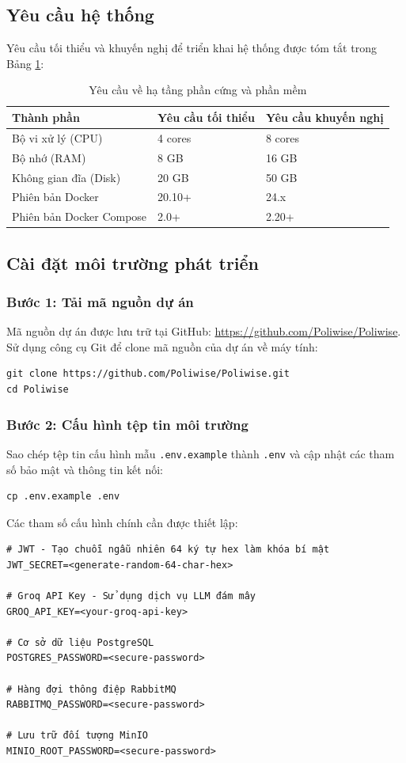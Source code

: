 \documentclass[12pt,a4paper]{report}
\begin{document}
\subsection{Yêu cầu hệ thống}
Yêu cầu tối thiểu và khuyến nghị để triển khai hệ thống được tóm tắt trong Bảng \ref{tab:req_specs}:
\begin{table}[H]
\centering
\caption{Yêu cầu về hạ tầng phần cứng và phần mềm}
\label{tab:req_specs}
\begin{tabularx}{\textwidth}{|l|X|X|}
\hline
\rowcolor{gray!10}
Thành phần & Yêu cầu tối thiểu & Yêu cầu khuyến nghị \\ \hline
Bộ vi xử lý (CPU) & 4 cores & 8 cores \\ \hline
Bộ nhớ (RAM) & 8 GB & 16 GB \\ \hline
Không gian đĩa (Disk) & 20 GB & 50 GB \\ \hline
Phiên bản Docker & 20.10+ & 24.x \\ \hline
Phiên bản Docker Compose & 2.0+ & 2.20+ \\ \hline
\end{tabularx}
\end{table}

\subsection{Cài đặt môi trường phát triển}

\subsubsection{Bước 1: Tải mã nguồn dự án}
Mã nguồn dự án được lưu trữ tại GitHub: \url{https://github.com/Poliwise/Poliwise}. Sử dụng công cụ Git để clone mã nguồn của dự án về máy tính:
\begin{verbatim}
git clone https://github.com/Poliwise/Poliwise.git
cd Poliwise
\end{verbatim}

\subsubsection{Bước 2: Cấu hình tệp tin môi trường}
Sao chép tệp tin cấu hình mẫu \texttt{.env.example} thành \texttt{.env} và cập nhật các tham số bảo mật và thông tin kết nối:
\begin{verbatim}
cp .env.example .env
\end{verbatim}
Các tham số cấu hình chính cần được thiết lập:
\begin{verbatim}
# JWT - Tạo chuỗi ngẫu nhiên 64 ký tự hex làm khóa bí mật
JWT_SECRET=<generate-random-64-char-hex>

# Groq API Key - Sử dụng dịch vụ LLM đám mây
GROQ_API_KEY=<your-groq-api-key>

# Cơ sở dữ liệu PostgreSQL
POSTGRES_PASSWORD=<secure-password>

# Hàng đợi thông điệp RabbitMQ
RABBITMQ_PASSWORD=<secure-password>

# Lưu trữ đối tượng MinIO
MINIO_ROOT_PASSWORD=<secure-password>
\end{verbatim}
\end{document}
